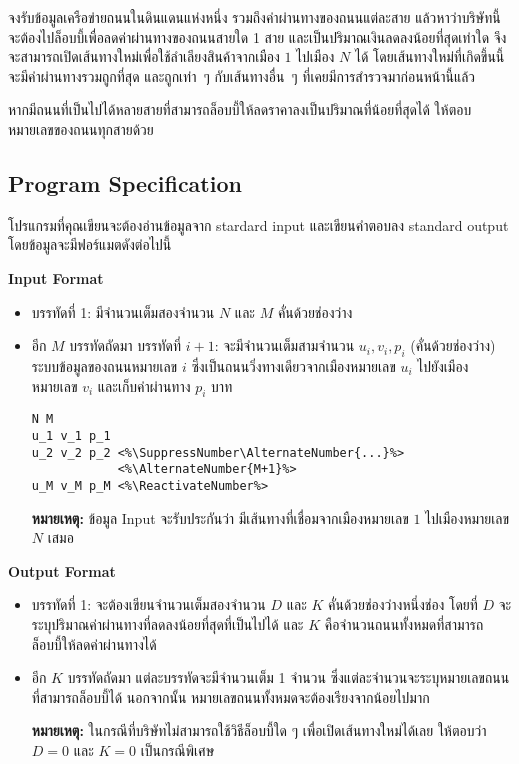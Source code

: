 จงรับข้อมูลเครือข่ายถนนในดินแดนแห่งหนึ่ง รวมถึงค่าผ่านทางของถนนแต่ละสาย 
แล้วหาว่าบริษัทนี้จะต้องไปล็อบบี้เพื่อลดค่าผ่านทางของถนนสายใด 1 สาย 
และเป็นปริมาณเงินลดลงน้อยที่สุดเท่าใด จึงจะสามารถเปิดเส้นทางใหม่เพื่อใช้ลำเลียงสินค้าจากเมือง $1$ ไปเมือง $N$ ได้ 
โดยเส้นทางใหม่ที่เกิดขึ้นนี้จะมีค่าผ่านทางรวมถูกที่สุด และถูกเท่า~ๆ กับเส้นทางอื่น~ๆ ที่เคยมีการสำรวจมาก่อนหน้านี้แล้ว

หากมีถนนที่เป็นไปได้หลายสายที่สามารถล็อบบี้ให้ลดราคาลงเป็นปริมาณที่น้อยที่สุดได้ 
ให้ตอบหมายเลขของถนนทุกสายด้วย

\subsection*{\sectionfont\upshape Program Specification}

โปรแกรมที่คุณเขียนจะต้องอ่านข้อมูลจาก stardard input 
และเขียนคำตอบลง standard output โดยข้อมูลจะมีฟอร์แมตดังต่อไปนี้

\bigskip\noindent
{\sectionfont\bfseries Input Format}
\begin{itemize}
\item บรรทัดที่ 1: มีจำนวนเต็มสองจำนวน $N$ และ $M$ คั่นด้วยช่องว่าง
\item อีก $M$ บรรทัดถัดมา บรรทัดที่ $i+1$: จะมีจำนวนเต็มสามจำนวน $u_i, v_i, p_i$
    (คั่นด้วยช่องว่าง) ระบบข้อมูลของถนนหมายเลข $i$ ซึ่งเป็นถนนวิ่งทางเดียวจากเมืองหมายเลข $u_i$ 
    ไปยังเมืองหมายเลข $v_i$ และเก็บค่าผ่านทาง $p_i$ บาท
\begin{lstlisting}
N M
u_1 v_1 p_1
u_2 v_2 p_2 <%\SuppressNumber\AlternateNumber{...}%>
            <%\AlternateNumber{M+1}%>
u_M v_M p_M <%\ReactivateNumber%>
\end{lstlisting}
\textbf{หมายเหตุ:} ข้อมูล Input จะรับประกันว่า 
มีเส้นทางที่เชื่อมจากเมืองหมายเลข $1$ ไปเมืองหมายเลข $N$ เสมอ
\end{itemize}

\medskip\noindent
{\sectionfont\bfseries Output Format}
\begin{itemize}
\item บรรทัดที่ 1: จะต้องเขียนจำนวนเต็มสองจำนวน $D$ และ $K$ คั่นด้วยช่องว่างหนึ่งช่อง 
    โดยที่ $D$ จะระบุปริมาณค่าผ่านทางที่ลดลงน้อยที่สุดที่เป็นไปได้ และ $K$ คือจำนวนถนนทั้งหมดที่สามารถล็อบบี้ให้ลดค่าผ่านทางได้
\item อีก $K$ บรรทัดถัดมา แต่ละบรรทัดจะมีจำนวนเต็ม 1 จำนวน
    ซึ่งแต่ละจำนวนจะระบุหมายเลขถนนที่สามารถล็อบบี้ได้ นอกจากนั้น หมายเลขถนนทั้งหมดจะต้องเรียงจากน้อยไปมาก

    \textbf{หมายเหตุ:} ในกรณีที่บริษัทไม่สามารถใช้วิธีล็อบบี้ใด ๆ เพื่อเปิดเส้นทางใหม่ได้เลย 
    ให้ตอบว่า $D=0$ และ $K=0$ เป็นกรณีพิเศษ
\end{itemize}


